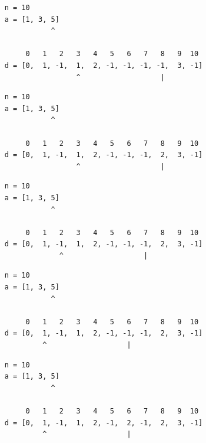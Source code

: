 \begin{frame}[fragile]
\begin{verbatim}
     n = 10
     a = [1, 3, 5]
                ^

          0   1   2   3   4   5   6   7   8   9  10
     d = [0,  1, -1,  1,  2, -1, -1, -1, -1,  3, -1]
                      ^                   |
\end{verbatim}
\end{frame}
\addtocounter{framenumber}{-1}

\begin{frame}[fragile]
\begin{verbatim}
     n = 10
     a = [1, 3, 5]
                ^

          0   1   2   3   4   5   6   7   8   9  10
     d = [0,  1, -1,  1,  2, -1, -1, -1,  2,  3, -1]
                      ^                   |
\end{verbatim}
\end{frame}
\addtocounter{framenumber}{-1}

\begin{frame}[fragile]
\begin{verbatim}
     n = 10
     a = [1, 3, 5]
                ^

          0   1   2   3   4   5   6   7   8   9  10
     d = [0,  1, -1,  1,  2, -1, -1, -1,  2,  3, -1]
                  ^                   |
\end{verbatim}
\end{frame}
\addtocounter{framenumber}{-1}

\begin{frame}[fragile]
\begin{verbatim}
     n = 10
     a = [1, 3, 5]
                ^

          0   1   2   3   4   5   6   7   8   9  10
     d = [0,  1, -1,  1,  2, -1, -1, -1,  2,  3, -1]
              ^                   |
\end{verbatim}
\end{frame}
\addtocounter{framenumber}{-1}

\begin{frame}[fragile]
\begin{verbatim}
     n = 10
     a = [1, 3, 5]
                ^

          0   1   2   3   4   5   6   7   8   9  10
     d = [0,  1, -1,  1,  2, -1,  2, -1,  2,  3, -1]
              ^                   |
\end{verbatim}
\end{frame}
\addtocounter{framenumber}{-1}

